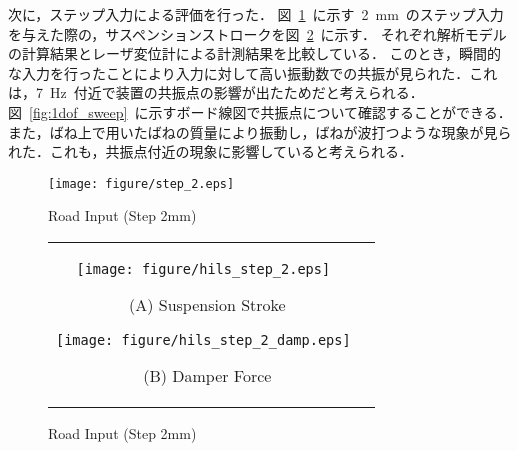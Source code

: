 \documentclass[a4paper,12pt]{article_vdlab_sotsuron}
\begin{document}
\newpage
次に，ステップ入力による評価を行った．
図~\ref{fig:step2}~に示す~2~mm~のステップ入力を与えた際の，サスペンションストロークを図~\ref{fig:step_2}~に示す．
それぞれ解析モデルの計算結果とレーザ変位計による計測結果を比較している．
このとき，瞬間的な入力を行ったことにより入力に対して高い振動数での共振が見られた．これは，7~Hz~付近で装置の共振点の影響が出たためだと考えられる．
図~\ref{fig:1dof_sweep}~に示すボード線図で共振点について確認することができる．
また，ばね上で用いたばねの質量により振動し，ばねが波打つような現象が見られた．これも，共振点付近の現象に影響していると考えられる．

\vspace{10mm}
\begin{figure}[h]
  \begin{center}
   \texttt{[image: figure/step\_2.eps]}
  \vspace{2mm}
  \caption{Road Input (Step 2mm)}
  \end{center}
  \label{fig:step2}
\end{figure}

\vspace{10mm}
\begin{figure}[h]
    \begin{tabular}{cc}
      \begin{minipage}{0.45\hsize}
	\begin{center}
	  \texttt{[image: figure/hils\_step\_2.eps]}
	  \end{center}
	  \begin{center}
	  \vspace{2mm}
	  \ (A) Suspension Stroke
	  \end{center}
	\end{minipage}
       \begin{minipage}{0.5\hsize}
	\begin{center}
	  \texttt{[image: figure/hils\_step\_2\_damp.eps]}
	  \end{center}
	  \begin{center}
	  \vspace{2mm}
	  \ (B) Damper Force
	  \end{center}
	   \end{minipage}
           \end{tabular}
	\label{fig:step_2}
      \begin{center}
      \vspace{2mm}
      \caption{Road Input (Step 2mm)}
    \end{center}
\end{figure}
\end{document}
